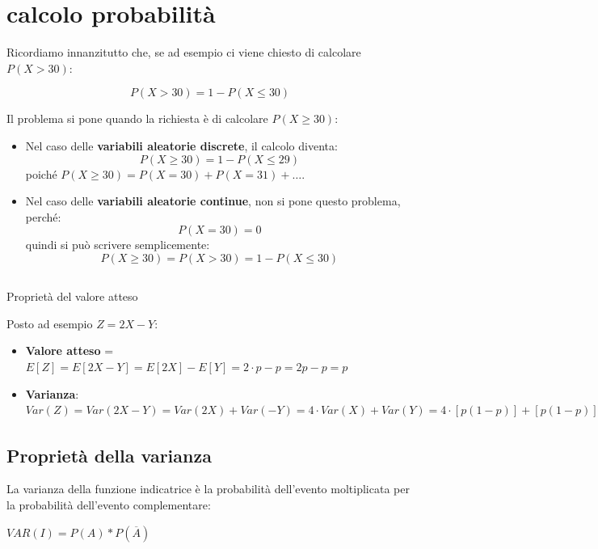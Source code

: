 \documentclass{article}
\begin{document}
\pagebreak

\section{calcolo probabilità}

Ricordiamo innanzitutto che, se ad esempio ci viene chiesto di calcolare $P(X > 30)$:

\[
P(X > 30) = 1 - P(X \leq 30)
\]

Il problema si pone quando la richiesta è di calcolare $P(X \geq 30)$:

\begin{itemize}
  \item Nel caso delle \textbf{variabili aleatorie discrete}, il calcolo diventa:
  \[
  P(X \geq 30) = 1 - P(X \leq 29)
  \]
  poiché $P(X \geq 30) = P(X = 30) + P(X = 31) + \dots$.

  \item Nel caso delle \textbf{variabili aleatorie continue}, non si pone questo problema, perché:
  \[
  P(X = 30) = 0
  \]
  quindi si può scrivere semplicemente:
  \[
  P(X \geq 30) = P(X > 30) = 1 - P(X \leq 30)
  \]
\end{itemize}

\subsection*{}{Proprietà del valore atteso}

Posto ad esempio $Z = 2X - Y$:

\begin{itemize}
    \item \textbf{Valore atteso} = $E[Z] = E[2X - Y] = E[2X] - E[Y] = 2 \cdot p - p = 2p - p = p$
    \item \textbf{Varianza}:  $Var(Z) = Var(2X - Y) = Var(2X) + Var(-Y) = 4 \cdot Var(X) + Var(Y) = 4 \cdot [p(1-p)] + [p(1-p)] = 4 \cdot (p - p^2) + [p - p^2] = 4p - 4p^2 + p - p^2 = -5p^2 + 5p = 5p(1 - p)$
\end{itemize}

\subsection*{Proprietà della varianza}

La varianza della funzione indicatrice è la probabilità dell'evento moltiplicata per la probabilità dell'evento complementare:

$VAR(I) = P(A) * P(\overline{A})$
\end{document}
